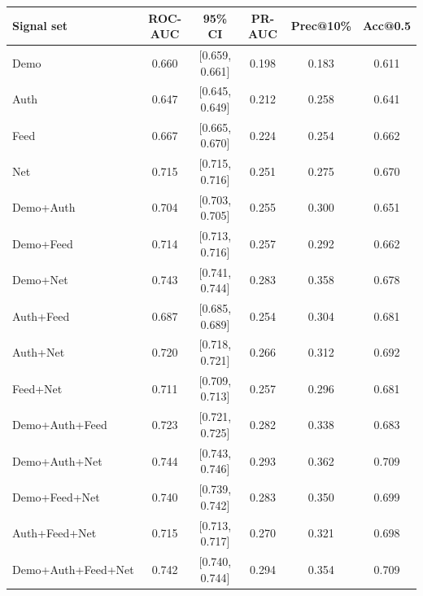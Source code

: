 \begin{tabular}{lccccc}
\toprule
Signal set & ROC-AUC & 95\% CI & PR-AUC & Prec@10\% & Acc@0.5 \\
\midrule
Demo & 0.660 & [0.659, 0.661] & 0.198 & 0.183 & 0.611 \\
Auth & 0.647 & [0.645, 0.649] & 0.212 & 0.258 & 0.641 \\
Feed & 0.667 & [0.665, 0.670] & 0.224 & 0.254 & 0.662 \\
Net & 0.715 & [0.715, 0.716] & 0.251 & 0.275 & 0.670 \\
Demo+Auth & 0.704 & [0.703, 0.705] & 0.255 & 0.300 & 0.651 \\
Demo+Feed & 0.714 & [0.713, 0.716] & 0.257 & 0.292 & 0.662 \\
Demo+Net & 0.743 & [0.741, 0.744] & 0.283 & 0.358 & 0.678 \\
Auth+Feed & 0.687 & [0.685, 0.689] & 0.254 & 0.304 & 0.681 \\
Auth+Net & 0.720 & [0.718, 0.721] & 0.266 & 0.312 & 0.692 \\
Feed+Net & 0.711 & [0.709, 0.713] & 0.257 & 0.296 & 0.681 \\
Demo+Auth+Feed & 0.723 & [0.721, 0.725] & 0.282 & 0.338 & 0.683 \\
Demo+Auth+Net & 0.744 & [0.743, 0.746] & 0.293 & 0.362 & 0.709 \\
Demo+Feed+Net & 0.740 & [0.739, 0.742] & 0.283 & 0.350 & 0.699 \\
Auth+Feed+Net & 0.715 & [0.713, 0.717] & 0.270 & 0.321 & 0.698 \\
Demo+Auth+Feed+Net & 0.742 & [0.740, 0.744] & 0.294 & 0.354 & 0.709 \\
\bottomrule
\end{tabular}